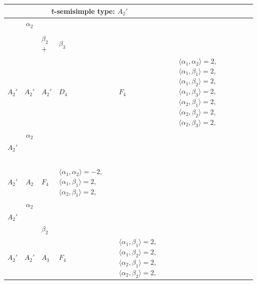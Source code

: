 \documentclass[12pt]{report}
\begin{document}
\begin{appendix}
{\begin{longtable}{rcl p{1cm}p{1cm}p{3cm} }
\\
\hline\multicolumn{5}{c}{$\mathfrak{k}$-semisimple type: $A_2'$}\\
\hline\hline\begin{tabular}{cc}$\alpha_1$+ & $\alpha_2$\\\tiny{  } & \tiny{  }\end{tabular} &\begin{tabular}{c} = \\~ \end{tabular} & \begin{tabular}{ccc}$\beta_1$+ & $\beta_2$+ & $\beta_3$\\\tiny{ $A_2'$ } & \tiny{ $A_2'$ } & \tiny{ $A_2'$ }\end{tabular} & $D_4$ & $F_4$ & $\langle\alpha_1, \alpha_2\rangle=2$,  $\langle\alpha_1, \beta_1\rangle=2$, $\langle\alpha_1, \beta_2\rangle=2$, $\langle\alpha_1, \beta_3\rangle=2$, $\langle\alpha_2, \beta_1\rangle=2$, $\langle\alpha_2, \beta_2\rangle=2$, $\langle\alpha_2, \beta_3\rangle=2$, 
\\
\begin{tabular}{cc}$\alpha_1$+ & $\alpha_2$\\\tiny{ $A_2'$ } & \tiny{  }\end{tabular} &\begin{tabular}{c} = \\~ \end{tabular} & \begin{tabular}{c}$\beta_1$\\\tiny{ $A_2'$ }\end{tabular} & $A_2$ & $F_4$ & $\langle\alpha_1, \alpha_2\rangle=-2$,  $\langle\alpha_1, \beta_1\rangle=2$, $\langle\alpha_2, \beta_1\rangle=2$, 
\\
\begin{tabular}{cc}$\alpha_1$+ & $\alpha_2$\\\tiny{ $A_2'$ } & \tiny{  }\end{tabular} &\begin{tabular}{c} = \\~ \end{tabular} & \begin{tabular}{cc}$\beta_1$+ & $\beta_2$\\\tiny{ $A_2'$ } & \tiny{ $A_2'$ }\end{tabular} & $A_3$ & $F_4$ &  $\langle\alpha_1, \beta_1\rangle=2$, $\langle\alpha_1, \beta_2\rangle=2$, $\langle\alpha_2, \beta_1\rangle=2$, $\langle\alpha_2, \beta_2\rangle=2$, 
\\

\end{longtable}}
\end{appendix}
\end{document}
